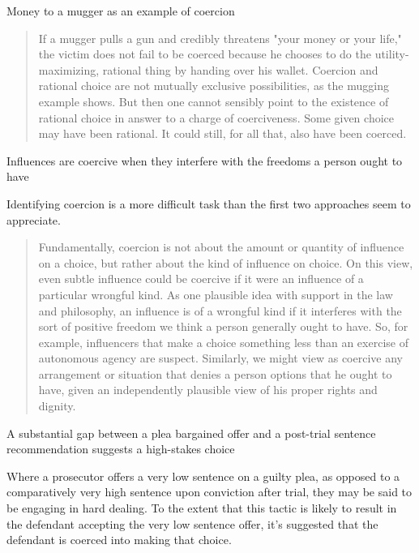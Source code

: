 Money to a mugger as an example of coercion

\begin{quote}
    If a mugger pulls a gun and credibly threatens "your money or your life," the victim does not fail to be coerced because he chooses to do the utility-maximizing, rational thing by handing over his wallet. Coercion and rational choice are not mutually exclusive possibilities, as the mugging example shows. But then one cannot sensibly point to the existence of rational choice in answer to a charge of coerciveness. Some given choice may have been rational. It could still, for all that, also have been coerced.
\end{quote}

Influences are coercive when they interfere with the freedoms a person ought to have

Identifying coercion is a more difficult task than the first two approaches seem to appreciate.
\begin{quote}
    Fundamentally, coercion is not about the amount or quantity of influence on a choice, but rather about the kind of influence on choice. On this view, even subtle influence could be coercive if it were an influence of a particular wrongful kind. As one plausible idea with support in the law and philosophy, an influence is of a wrongful kind if it interferes with the sort of positive freedom we think a person generally ought to have. So, for example, influencers that make a choice something less than an exercise of autonomous agency are suspect. Similarly, we might view as coercive any arrangement or situation that denies a person options that he ought to have, given an independently plausible view of his proper rights and dignity.
\end{quote}

A substantial gap between a plea bargained offer and a post-trial sentence recommendation suggests a high-stakes choice

Where a prosecutor offers a very low sentence on a guilty plea, as opposed to a comparatively very high sentence upon conviction after trial, they may be said to be engaging in hard dealing. To the extent that this tactic is likely to result in the defendant accepting the very low sentence offer, it's suggested that the defendant is coerced into making that choice.

